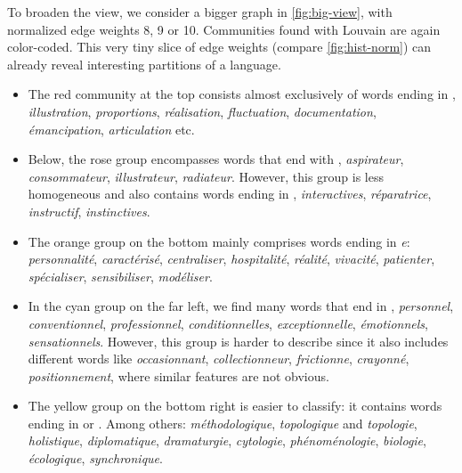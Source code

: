 \vspace{-1.2em}

To broaden the view, we consider a bigger graph in \autoref{fig:big-view}, with normalized edge weights 8, 9 or 10. Communities found with Louvain are again color-coded. This very tiny slice of edge weights (compare \autoref{fig:hist-norm}) can already reveal interesting partitions of a language.

\begin{itemize}
    \item The red community at the top consists almost exclusively of words ending in , \eg \textit{illustration}, \textit{proportions}, \textit{réalisation}, \textit{fluctuation}, \textit{documentation}, \textit{émancipation}, \textit{articulation} etc.
    
    \item Below, the rose group encompasses words that end with , \eg \textit{aspirateur}, \textit{consommateur}, \textit{illustrateur}, \textit{radiateur}. However, this group is less homogeneous and also contains words ending in , \eg \textit{interactives}, \textit{réparatrice}, \textit{instructif}, \textit{instinctives}. 
    
    \item The orange group on the bottom mainly comprises words ending in \textit{e}: \textit{personnalité}, \textit{caractérisé}, \textit{centraliser}, \textit{hospitalité}, \textit{réalité}, \textit{vivacité}, \textit{patienter}, \textit{spécialiser}, \textit{sensibiliser}, \textit{modéliser}.
    
    \item In the cyan group on the far left, we find many words that end in , \eg \textit{personnel}, \textit{conventionnel}, \textit{professionnel}, \textit{conditionnelles}, \textit{exceptionnelle}, \textit{émotionnels}, \textit{sensationnels}. However, this group is harder to describe since it also includes different words like \textit{occasionnant}, \textit{collectionneur}, \textit{frictionne}, \textit{crayonné}, \textit{positionnement}, where similar features are not obvious.
    
    \item The yellow group on the bottom right is easier to classify: it contains words ending in  or . Among others: \textit{méthodologique}, \textit{topologique} and \textit{topologie}, \textit{holistique}, \textit{diplomatique}, \textit{dramaturgie}, \textit{cytologie}, \textit{phénoménologie}, \textit{biologie}, \textit{écologique}, \textit{synchronique}. 
\end{itemize}

